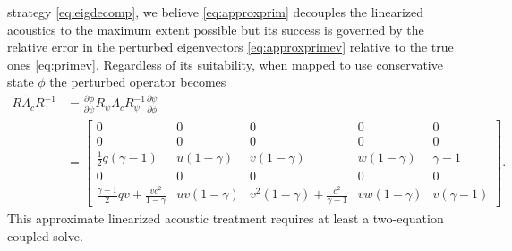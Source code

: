 \documentclass[letterpaper,11pt,nointlimits,reqno]{amsart}
\begin{document}
strategy \eqref{eq:eigdecomp}, we believe \eqref{eq:approxprim} decouples the
linearized acoustics to the maximum extent possible but its success is governed
by the relative error in the perturbed eigenvectors \eqref{eq:approxprimev}
relative to the true ones \eqref{eq:primev}.  Regardless of its suitability,
when mapped to use conservative state $\phi$ the perturbed operator becomes
\begin{align}
  R \tilde\Lambda_c R^{-1}
  &=
  \frac{\partial \phi}{\partial \psi}
  R_\psi \tilde\Lambda_c R_\psi^{-1}
  \frac{\partial \psi}{\partial \phi}
\\
 &=
\begin{bmatrix}
 0 & 0 & 0 & 0 & 0 \\
 0 & 0 & 0 & 0 & 0 \\
 \frac{1}{2} q (\gamma-1) & u(1-\gamma)  & v(1-\gamma)  & w(1-\gamma)  & \gamma-1  \\
 0 & 0 & 0 & 0 & 0 \\
 \frac{\gamma-1}{2} q v +\frac{v c^2}{1-\gamma} & u v (1-\gamma ) & v^2 (1-\gamma)+\frac{c^2}{\gamma-1} & v w (1-\gamma ) & v (\gamma-1 )
\end{bmatrix}
.
\end{align}
This approximate linearized acoustic treatment requires at least a two-equation
coupled solve.
\end{document}
